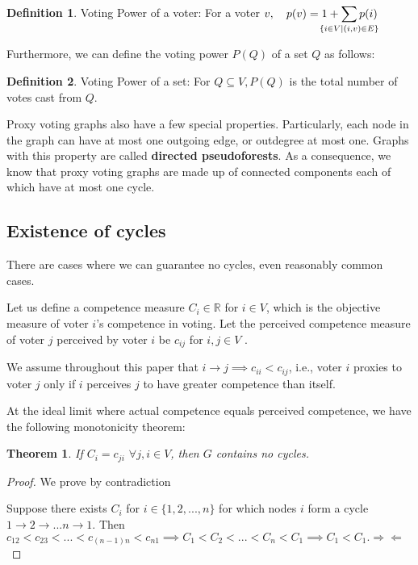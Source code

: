 \documentclass[10pt]{article}
\newtheorem{theorem}{Theorem}[section]
\theoremstyle{definition}
\newtheorem{definition}{Definition}[section]
\begin{document}
\theoremstyle{definition}
\begin{definition}{Voting Power of a voter:}
For a voter $v, \quad p(v) = 1 + \smashoperator{\sum\limits_{\{i \in V \mid (i,v) \in E\}}}p(i)$
\end{definition}

Furthermore, we can define the voting power $P(Q)$ of a set $Q$ as follows:

\theoremstyle{definition}
\begin{definition}{Voting Power of a set:}
For $Q \subseteq V, P(Q)$ is the total number of votes cast from $Q$.
\end{definition}



Proxy voting graphs also have a few special properties. Particularly, each node in the graph can have at most one outgoing edge, or outdegree at most one. Graphs with this property are called \textbf{directed pseudoforests}. As a consequence, we know that proxy voting graphs are made up of connected components each of which have at most one cycle.




\subsection{Existence of cycles}

There are cases where we can guarantee no cycles, even reasonably common cases.

Let us define a competence measure $C_i \in \mathbb{R}$ for $ i \in V$, which is the objective measure of voter $i$'s competence in voting. Let the perceived competence measure of voter $j$ perceived by voter $i$ be $c_{ij}$ for $i, j \in V$ . 

We assume throughout this paper that $i \rightarrow j \implies c_{ii} < c_{ij}$, i.e., voter $i$ proxies to voter $j$ only if $i$ perceives $j$ to have greater competence than itself.


At the ideal limit where actual competence equals perceived competence, we have the following monotonicity theorem:

\begin{theorem}

If $C_i = c_{ji}$ $\forall j, i \in V$, then $G$ contains no cycles.

\end{theorem}

\begin{proof}

We prove by contradiction

Suppose there exists $C_i$ for $i \in \{1, 2, ..., n\}$ for which nodes $i$ form a cycle $1 \rightarrow 2 \rightarrow ... n \rightarrow 1$. Then $c_{12} < c_{23 }< ... < c_{(n-1)n} < c_{n1} \implies C_1 < C_2 < ... < C_n < C_1 \implies C_1 < C_1. \Rightarrow\Leftarrow$
\end{proof}
\end{document}
